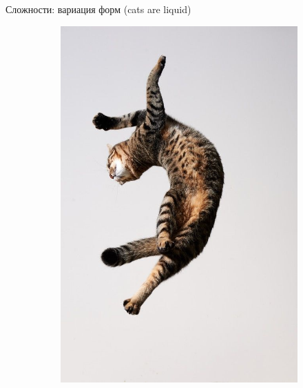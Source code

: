 \documentclass[aspectratio=169]{beamer}
\begin{document}
\begin{frame}{Сложности: вариация форм (cats are liquid)}
\begin{figure}
\begin{subfigure}[b]{.3\linewidth}
            \includegraphics[width=\linewidth]{graphs/fig10_1.jpg}
        \end{subfigure}
        \begin{subfigure}[b]{.3\linewidth}

\end{subfigure}
\end{figure}
\end{frame}
\end{document}
